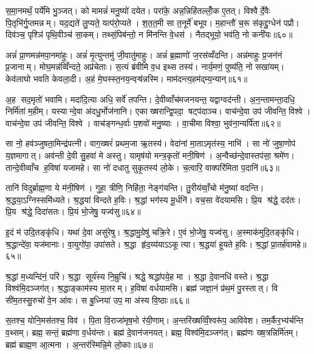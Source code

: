 स॒मा॒नमर्थं॒ पर्ये॑मि भु॒ञ्जत्। को मामन्नं॑ मनु॒ष्यो॑ दयेत। परा॑के॒ अन्न॒न्निहि॑तल्लोँ॒क ए॒तत्। विश्वैर्दे॒वैः पि॒तृभि॑र्गु॒प्तमन्नम्। यद॒द्यते॑ लु॒प्यते॒ यत्प॑रो॒प्यते। श॒त॒त॒मी सा त॒नूर्मे॑ बभूव। म॒हान्तौ॑ च॒रू स॑कृद्दु॒ग्धेन॑ पप्रौ। दिव॑ञ्च॒ पृश्ञि॑ पृथि॒वीञ्च॑ सा॒कम्। तथ्सं॒पिब॑न्तो॒ न मि॑नन्ति वे॒धस॑। नैतद्भूयो॒ भव॑ति॒ नो कनी॑यः॥६०॥

अन्नं॑ प्रा॒णमन्न॑मपा॒नमा॑हुः। अन्नं॑ मृ॒त्युन्तमु॑ जी॒वातु॑माहुः। अन्नं॑ ब्र॒ह्माणो॑ ज॒रस॑व्वँदन्ति। अन्न॑माहुः प्र॒जन॑नं प्र॒जानाम्। मोघ॒मन्न॑व्विँन्दते॒ अप्र॑चेताः। स॒त्यं ब्र॑वीमि व॒ध इथ्स तस्य॑। नार्य॒मणं॒ पुष्य॑ति॒ नो सखा॑यम्। केव॑लाघो भवति केवला॒दी। अ॒हं मे॒घस्स्त॒नय॒न्वऱ़्ष॑न्नस्मि। माम॑दन्त्य॒हम॑द्म्य॒न्यान्॥६१॥

अ॒ह सद॒मृतो॑ भवामि। मदा॑दि॒त्या अधि॒ सर्वे॑ तपन्ति। दे॒वीव्वाँच॑मजनयन्त॒ यद्वाग्वद॑न्ती। अ॒न॒न्तामन्ता॒दधि॒ निर्मि॑तां म॒हीम्। यस्यान्दे॒वा अ॑दधु॒र्भोज॑नानि। एकाख्षरान्द्वि॒पदा॒ षट्प॑दाञ्च। वाच॑न्दे॒वा उप॑ जीवन्ति॒ विश्वे। वाच॑न्दे॒वा उप॑ जीवन्ति॒ विश्वे। वाच॑ङ्गन्ध॒र्वाः प॒शवो॑ मनु॒ष्याः। वा॒चीमा विश्वा॒ भुव॑ना॒न्यर्पि॑ता॥६२॥

सा नो॒ हव॑ञ्जुषता॒मिन्द्र॑पत्नी। वाग॒ख्षरं॑ प्रथम॒जा ऋ॒तस्य॑। वेदा॑नां मा॒ताऽमृत॑स्य॒ नाभि॑। सा नो॑ जुषा॒णोप॑ य॒ज्ञमागात्। अव॑न्ती दे॒वी सु॒हवा॑ मे अस्तु। यामृष॑यो मन्त्र॒कृतो॑ मनी॒षिण॑। अ॒न्वैच्छ॑न्दे॒वास्तप॑सा॒ श्रमे॑ण। तान्दे॒वीव्वाँच ह॒विषा॑ यजामहे। सा नो॑ दधातु सुकृ॒तस्य॑ लो॒के। च॒त्वारि॒ वाक्परि॑मिता प॒दानि॑॥६३॥

तानि॑ विदुर्ब्राह्म॒णा ये म॑नी॒षिण॑। गुहा॒ त्रीणि॒ निहि॑ता॒ नेङ्ग॑यन्ति। तु॒रीय॑व्वाँ॒चो म॑नु॒ष्या॑ वदन्ति। श्र॒द्धया॒ऽग्निस्समि॑ध्यते। श्र॒द्धया॑ विन्दते ह॒विः। श्र॒द्धां भग॑स्य मू॒र्धनि॑। वच॒सा वे॑दयामसि। प्रि॒य श्र॑द्धे॒ दद॑तः। प्रि॒य श्र॑द्धे॒ दिदा॑सतः। प्रि॒यं भो॒जेषु॒ यज्व॑सु॥६४॥

इ॒दं म॑ उदि॒तङ्कृ॑धि। यथा॑ दे॒वा असु॑रेषु। श्र॒द्धामु॒ग्रेषु॑ चक्रि॒रे। ए॒वं भो॒जेषु॒ यज्व॑सु। अ॒स्माक॑मुदि॒तङ्कृ॑धि। श्र॒द्धान्दे॑वा॒ यज॑मानाः। वा॒युगो॑पा॒ उपा॑सते। श्र॒द्धा हृ॑द॒य्य॑याऽऽकूत्या। श्र॒द्धया॑ हूयते ह॒विः। श्र॒द्धां प्रा॒तर्\mbox{}ह॑वामहे॥६५॥

श्र॒द्धां म॒ध्यन्दि॑नं॒ परि॑। श्र॒द्धा सूर्य॑स्य नि॒म्रुचि॑। श्रद्धे॒ श्रद्धा॑पये॒ह मा। श्र॒द्धा दे॒वानधि॑ वस्ते। श्र॒द्धा विश्व॑मि॒दञ्जग॑त्। श्र॒द्धाङ्काम॑स्य मा॒तरम्। ह॒विषा॑ वर्धयामसि। ब्रह्म॑ जज्ञा॒नं प्र॑थ॒मं पु॒रस्तात्। वि सी॑म॒तस्सु॒रुचो॑ वे॒न आ॑वः। स बु॒ध्निया॑ उप॒ मा अ॑स्य वि॒ष्ठाः॥६६॥

स॒तश्च॒ योनि॒मस॑तश्च॒ विव॑। पि॒ता वि॒राजा॑मृष॒भो र॑यी॒णाम्। अ॒न्तरि॑ख्षव्विँ॒श्वरू॑प॒ आवि॑वेश। तम॒र्कैर॒भ्य॑र्चन्ति व॒थ्सम्। ब्रह्म॒ सन्तं॒ ब्रह्म॑णा व॒र्धय॑न्तः। ब्रह्म॑ दे॒वान॑जनयत्। ब्रह्म॒ विश्व॑मि॒दञ्जग॑त्। ब्रह्म॑णः ख्ष॒त्रन्निर्मि॑तम्। ब्रह्म॑ ब्राह्म॒ण आ॒त्मना। अ॒न्तर॑स्मिन्नि॒मे लो॒काः॥६७॥

